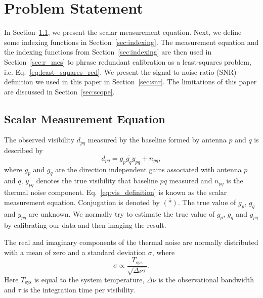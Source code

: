 \documentclass[useAMS,usenatbib]{mn2e}
\newcommand{\conj}[1]{\overline{#1}}
\begin{document}
\section{Problem Statement}
\label{sec:p_statement}
In Section~\ref{sec:s_mes}, we present the scalar measurement equation. Next, we define some indexing functions in Section~\ref{sec:indexing}. The measurement 
equation and the indexing functions from Section~\ref{sec:indexing} are then used in Section~\ref{sec:r_mes} to phrase redundant calibration as a least-squares problem, i.e. Eq.~\eqref{eq:least_squares_red}.
We present the signal-to-noise ratio (SNR) definition we used in this paper in Section~\ref{sec:snr}. The limitations of this paper are discussed in Section~\ref{sec:scope}.

\subsection{Scalar Measurement Equation}
\label{sec:s_mes}
The observed visibility $d_{pq}$ measured by the baseline formed by antenna $p$ and $q$ is described by
\begin{equation}
\label{eq:vis_definition}
d_{pq} = g_{p}\conj{g_q}y_{pq} + n_{pq},
\end{equation}
where $g_{p}$ and $g_{q}$ are the direction independent gains associated with antenna $p$ and $q$, $y_{pq}$ denotes the true visibility that baseline $pq$ measured
and $n_{pq}$ is the thermal noise component. Eq.~\eqref{eq:vis_definition} is known as the scalar measurement equation. Conjugation is denoted by $\conj{(*)}$. The true value of $g_p$, $g_q$ and $y_{pq}$ are unknown. We normally try to estimate the true value of
$g_p$, $g_q$ and $y_{pq}$ by calibrating our data and then imaging the result.

The real and imaginary components of the thermal noise are normally distributed with a mean of zero and a standard deviation $\sigma$, where   
\begin{equation}
\sigma \propto \frac{T_{\textrm{sys}}}{\sqrt{\Delta \nu \tau}}. 
\end{equation}
Here $T_{\textrm{sys}}$ is equal to the system temperature, $\Delta \nu$ is the observational bandwidth and $\tau$ is the integration time per visibility. 
\end{document}

